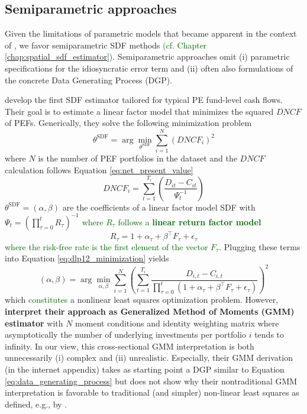 \subsection{Semiparametric approaches}

Given the limitations of parametric models that became apparent in the context of \cite{ACGP18}, we favor semiparametric SDF methods \textcolor{darkgreen}{(cf. Chapter \ref{chap:spatial_sdf_estimator})}.
Semiparametric approaches omit (i) parametric specifications for the idiosyncratic error term and (ii) often also formulations of the concrete Data Generating Process (DGP).


\cite{DLP12} develop the first SDF estimator tailored for typical PE fund-level cash flows.
Their goal is to estimate a linear factor model that minimizes the squared $DNCF$ of PEFs.
Generically, they solve the following minimization problem
\begin{equation}
	\label{eq:dlp12_minimization}
	\theta^{\mathrm{SDF}} = \arg \min_{\theta^{\mathrm{SDF}}} \sum_{i=1}^N \left( DNCF_i \right)^2
\end{equation}
where $N$ is the number of PEF portfolios in the dataset and the $DNCF$ calculation follows Equation \ref{eq:net_present_value}
\[
DNCF_i = 
\sum_{t=1}^{T_i}
\left(
\frac{D_{it} - C_{it}}{\Psi_{t}^{-1}}
\right)
\]
$\theta^{\mathrm{SDF}}=(\alpha, \beta)$ are the coefficients of a linear factor model SDF with $\Psi_t=(\prod_{\tau=0}^t R_{\tau})^{-1}$ \textcolor{darkgreen}{where $R_{\tau}$ follows a \textbf{linear return factor model}}
\begin{equation}
	R_{\tau}=1+\alpha_{\tau}+\beta^{\top}F_{\tau}+\epsilon_{\tau}
\end{equation}
\textcolor{darkgreen}{where the risk-free rate is the first element of the vector $F_{\tau}$.}
Plugging these terms into Equation \ref{eq:dlp12_minimization} yields
\[
\left( \alpha, \beta \right) 
= 
\arg \min_{\alpha, \beta} 
\sum_{i=1}^N 
\left( 
\sum_{t=1}^{T_i}
\frac{D_{i,t} - C_{i,t}}{\prod_{\tau=0}^t (1 + \alpha_{\tau}+\beta^{\top}F_{\tau}+\epsilon_{\tau}) } 
\right)^2
\]
which \textcolor{darkgreen}{constitutes} a nonlinear least squares optimization problem.
However, \cite{DLP12} \textbf{interpret their approach as Generalized Method of Moments (GMM) estimator} with $N$ moment conditions and identity weighting matrix where asymptotically the number of underlying investments per portfolio $i$ tends to infinity.
In our view, this cross-sectional GMM interpretation is both unnecessarily (i) complex and (ii) unrealistic.
Especially, their GMM derivation (in the internet appendix) takes as starting point a DGP similar to Equation \ref{eq:data_generating_process} but does not show why their nontraditional GMM interpretation is favorable to traditional (and simpler) non-linear least squares as defined, e.g., by \cite{PP97}.

